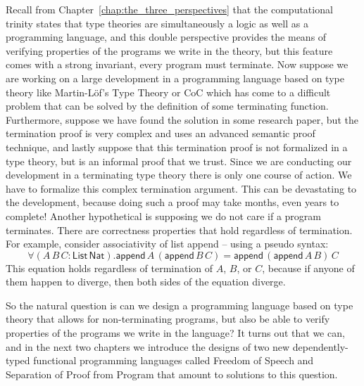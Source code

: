 \documentclass[phd,dedicationpage,ackpage,epigraphpage,figures]{uithesis}
\begin{document}
Recall from Chapter~\ref{chap:the_three_perspectives} that the
computational trinity states that type
theories are simultaneously a logic as well as a programming language,
and this double perspective provides the means of verifying properties
of the programs we write in the theory, but this feature comes with a
strong invariant, every program must terminate.  Now suppose we are
working on a large development in a programming language based on type
theory like Martin-L\"of's Type Theory or CoC which has come to a
difficult problem that can be solved by the definition of some
terminating function.  Furthermore, suppose we have found the solution
in some research paper, but the termination proof is very complex and
uses an advanced semantic proof technique, and lastly suppose that
this termination proof is not formalized in a type theory, but is an
informal proof that we trust.  Since we are conducting our development
in a terminating type theory there is only one course of action.  We
have to formalize this complex termination argument. This can be
devastating to the development, because doing such a proof may take
months, even years to complete!  Another hypothetical is supposing we
do not care if a program terminates.  There are correctness properties
that hold regardless of termination.  For example, consider
associativity of list append -- using a pseudo syntax:
\[ \forall (A\,B\,C :
\mathsf{List}\,\mathsf{Nat}).\mathsf{append}\,A\,(\mathsf{append}\,B\,C)
= \mathsf{append}\,(\mathsf{append}\,A\,B)\,C \] This equation holds
regardless of termination of $A$, $B$, or $C$, because if anyone of
them happen to diverge, then both sides of the equation diverge.  

So the natural question is can we design a programming language based
on type theory that allows for non-terminating programs, but also be
able to verify properties of the programs we write in the language?
It turns out that we can, and in the next two chapters we introduce
the designs of two new dependently-typed functional programming
languages called Freedom of Speech and Separation of Proof from
Program that amount to solutions to this question.
\end{document}
